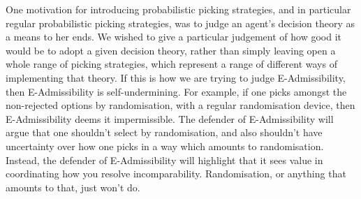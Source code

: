 \documentclass[a4paper]{article}
\newcommand\EU{\mathrm{EU}}
\newcommand{\todoold}[2][]{\todo[backgroundcolor=white,bordercolor=orange!10,linecolor=gray!10, #1,caption={},textcolor=gray]{Pre-rev: #2}}
\newcommand{\todooldinfo}[2][]{\todoold[#1]{#2}}
\newenvironment{CCM rewritten}
{\begingroup\color{blue}} %
{\endgroup}              %
\begin{document}
\begin{comment}
So, at least when we consider regular probabilistic picking strategies, things have become pretty bad for E-Admissibility: given some reasonable constraints on your uncertainty about the decision problem you'll face, the regular probabilistic picking strategies that pick for E-Admissibility are not themselves E-Admissible. And so, in this sense, E-Admissibility is self-undermining.

{
	There is a more fundamental point here: however one is going to judge choice functions, each probability, $p$, will think that $\EU_p$ is optimal; and so E-Admissibility will only judge expected utility theory as acceptable. When we considered (deterministic) strategies, we were accepting $\EU$ strategies as E-Admissibility strategies, so had some E-Admissibility strategies evaluated as E-Admissible. However, if we are judging the choice function by assigning a single evaluation of it, taking the imprecision into account, it will distinguish it from expected utility theory,  and thus all probability functions will think something else is better, namely being $\EU_p$ for the $p$ doing the evaluation; and thus, E-Admissibility is not itself E-Admissible. 
	}

\end{comment}



	
	
		One motivation for introducing probabilistic picking strategies, and in particular regular probabilistic picking strategies, was to judge an agent's decision theory as a means to her ends. We wished to give a particular judgement of how good it would be to adopt a given decision theory, rather than simply leaving open a whole range of picking strategies, which represent a range of different ways of implementing that theory.
	If this is how we are trying to judge E-Admissibility, then E-Admissibility is self-undermining.
	For example, if one picks amongst the non-rejected options by randomisation, with a regular randomisation device, then E-Admissibility deems it impermissible. 
	The defender of E-Admissibility will argue that one shouldn't select by randomisation, and also shouldn't have uncertainty over how one picks in a way which amounts to randomisation. 
	Instead, the defender of E-Admissibility will highlight that it sees value in coordinating how you resolve incomparability. Randomisation, or anything that amounts to that, just won't do. 
	
\end{document}
